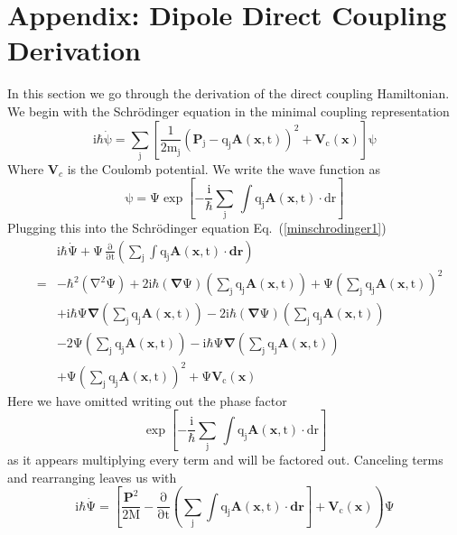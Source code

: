 \documentclass[twocolumn,english,pra,aps,superscriptaddress,floatfix]{revtex4-1}
\begin{document}
\section{Appendix: Dipole Direct Coupling Derivation}

In this section we go through the derivation of the direct coupling Hamiltonian. We begin with the Schr\"{o}dinger equation in the minimal coupling representation
\begin{equation}
\mathrm{i\hbar\dot{\psi}=\sum_j\left[\frac{1}{2m_j}\left(\mathbf{P}_j-q_j\mathbf{A}(\mathbf{x},t)\right)^2+\mathbf{V}_c(\mathbf{x})\right]\psi}
\label{minschrodinger1}
\end{equation}
Where $\mathbf{V}_c$ is the Coulomb potential. We write the wave function as
\begin{equation}
\mathrm{\psi=\Psi\exp{\left[-\frac{\mathrm{i}}{\mathrm{\hbar}}\sum_j\,\int q_j\mathbf{A}(\mathbf{x},t)\cdot\mathrm{dr}\right]}}
\label{directwavefunction}
\end{equation}
Plugging this into the Schr\"{o}dinger equation Eq.\ (\ref{minschrodinger1})
\begin{eqnarray}
&&\mathrm{\mathrm{i}\mathrm{\hbar}\dot{\Psi}+\Psi\,\frac{\partial}{\partial t}\left(\sum_j\int q_j\mathbf{A}(\mathbf{x},t) \cdot\mathbf{dr}\right)}\nonumber \\
&=&\mathrm{-\hbar^2(\nabla^2\Psi)+2i\hbar(\mathbf{\nabla}\Psi)\left(\sum_j q_j\mathbf{A}(\mathbf{x},t)\right)+\Psi \left(\sum_j q_j\mathbf{A}(\mathbf{x},t)\right)^2 }\nonumber \\
&&+\mathrm{i\hbar\Psi\mathbf{\nabla}\left(\sum_j q_j\mathbf{A}(\mathbf{x},t)\right) 
-2i\hbar(\mathbf{\nabla}\Psi)\left(\sum_j q_j\mathbf{A}(\mathbf{x},t)\right)}\nonumber \\
&&\mathrm{-2\Psi\left(\sum_j q_j\mathbf{A}(\mathbf{x},t)\right)-i\hbar\Psi\mathbf{\nabla}\left(\sum_j q_j\mathbf{A}(\mathbf{x},t)\right)}\nonumber \\
&&+\mathrm{\Psi\left(\sum_j q_j\mathbf{A}(\mathbf{x},t)\right)^2+
\Psi\mathbf{V}_c(\mathbf{x})}
\label{minschrodinger2}
\end{eqnarray}
Here we have omitted writing out the phase factor 
\begin{equation}
\mathrm{\exp{\left[-\frac{\mathrm{i}}{\mathrm{\hbar}}\sum_j\,\int q_j\mathbf{A}(\mathbf{x},t)\cdot\mathrm{dr}\right]}}
\label{phasefactor}
\end{equation}
as it appears multiplying every term and will be factored out.  Canceling terms and rearranging leaves us with
\begin{equation}
\mathrm{i\mathrm{\hbar}\dot{\Psi}=\mathrm{\left[\frac{\mathbf{P}^2}{2M}-\frac{\partial}{\partial t}\left(\sum_j\int q_j\mathbf{A}(\mathbf{x},t) \cdot\mathbf{dr}\right]+\mathbf{V}_c(\mathbf{x})\right)\Psi}}
\end{equation}
\end{document}
